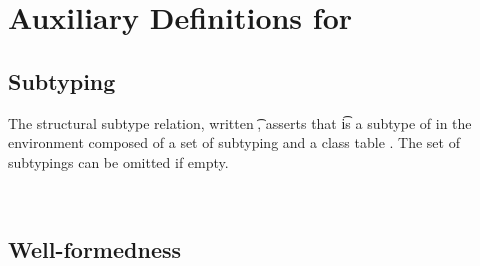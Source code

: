 \documentclass[a4paper,USenglish]{tex/lipics-v2016}
\begin{document}
\appendix
\section{Auxiliary Definitions for \kafka}%

\subsection{Subtyping}

The structural subtype relation, written \StrSub\M\K\t\tp, asserts that \t
is a subtype of \tp in the environment composed of a set of subtyping \M and
a class table \K.   The set of subtypings can be omitted if empty.

~\\

\begin{mathpar}


\end{mathpar}

\begin{mathpar}


\end{mathpar}

\subsection{Well-formedness}
\end{document}
